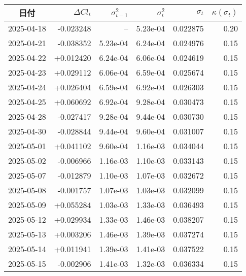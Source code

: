 
\begin{tabularx}{\textwidth}{@{}c r r r r r@{}}
\toprule
日付 & $\Delta Cl_t$ & $\sigma_{t-1}^{2}$ & $\sigma_t^{2}$ & $\sigma_t$ & $\kappa(\sigma_t)$\\
\midrule
2025-04-18 & -0.023248 & --        & 5.23e-04 & 0.022875 & 0.20\\
2025-04-21 & -0.038352 & 5.23e-04 & 6.24e-04 & 0.024976 & 0.15\\
2025-04-22 & +0.012420 & 6.24e-04 & 6.06e-04 & 0.024619 & 0.15\\
2025-04-23 & +0.029112 & 6.06e-04 & 6.59e-04 & 0.025674 & 0.15\\
2025-04-24 & +0.026404 & 6.59e-04 & 6.92e-04 & 0.026303 & 0.15\\
2025-04-25 & +0.060692 & 6.92e-04 & 9.28e-04 & 0.030473 & 0.15\\
2025-04-28 & -0.027417 & 9.28e-04 & 9.44e-04 & 0.030730 & 0.15\\
2025-04-30 & -0.028844 & 9.44e-04 & 9.60e-04 & 0.031007 & 0.15\\
2025-05-01 & +0.041102 & 9.60e-04 & 1.16e-03 & 0.034044 & 0.15\\
2025-05-02 & -0.006966 & 1.16e-03 & 1.10e-03 & 0.033143 & 0.15\\
2025-05-07 & -0.012879 & 1.10e-03 & 1.07e-03 & 0.032672 & 0.15\\
2025-05-08 & -0.001757 & 1.07e-03 & 1.03e-03 & 0.032099 & 0.15\\
2025-05-09 & +0.055284 & 1.03e-03 & 1.33e-03 & 0.036493 & 0.15\\
2025-05-12 & +0.029934 & 1.33e-03 & 1.46e-03 & 0.038207 & 0.15\\
2025-05-13 & +0.003206 & 1.46e-03 & 1.39e-03 & 0.037274 & 0.15\\
2025-05-14 & +0.011941 & 1.39e-03 & 1.41e-03 & 0.037522 & 0.15\\
2025-05-15 & -0.002906 & 1.41e-03 & 1.32e-03 & 0.036334 & 0.15\\

\end{tabularx}
